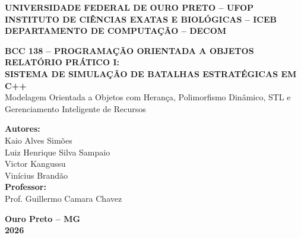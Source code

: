 \documentclass[12pt,a4paper]{article}
\begin{document}
\hypersetup{pageanchor=false}
\begin{titlepage}
    \centering
    {\large \textbf{UNIVERSIDADE FEDERAL DE OURO PRETO -- UFOP}}\\[0.2cm]
    {\large \textbf{INSTITUTO DE CIÊNCIAS EXATAS E BIOLÓGICAS -- ICEB}}\\[0.2cm]
    {\large \textbf{DEPARTAMENTO DE COMPUTAÇÃO -- DECOM}}\\[0.2cm]

    \vfill

    {\large \textbf{BCC 138 -- PROGRAMAÇÃO ORIENTADA A OBJETOS}}\\[0.6cm]

    {\LARGE \textbf{RELATÓRIO PRÁTICO I:}}\\[0.3cm]
    {\Large \textbf{SISTEMA DE SIMULAÇÃO DE BATALHAS ESTRATÉGICAS EM C++}}\\[0.4cm]
    {\large Modelagem Orientada a Objetos com Herança, Polimorfismo Dinâmico, STL e Gerenciamento Inteligente de Recursos}

    \vfill

    {\large \textbf{Autores:}}\\[0.25cm]
    Kaio Alves Simões\\[0.15cm]
    Luiz Henrique Silva Sampaio\\[0.15cm]
    Victor Kangussu\\[0.15cm]
    Vinícius Brandão\\[0.8cm]

    {\large \textbf{Professor:}}\\[0.25cm]
    Prof. Guillermo Camara Chavez

    \vfill

    {\large \textbf{Ouro Preto -- MG}}\\[0.2cm]
    {\large \textbf{2026}}
\end{titlepage}

\hypersetup{pageanchor=true}
\thispagestyle{empty}
\tableofcontents
\newpage

\setcounter{page}{1}

\end{document}

